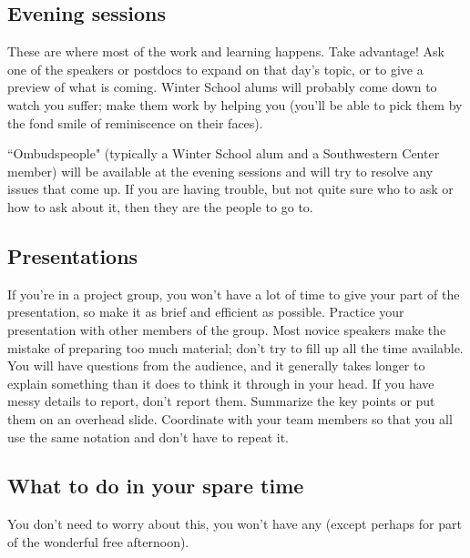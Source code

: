 \documentclass{article}
\begin{document}
\subsection{Evening sessions}
\label{sec:even-quest-sess}
These are where most of the work and learning happens. Take advantage!  
Ask one of the speakers or postdocs to expand on that day's topic, or to
give a preview of what is coming.  Winter School alums will probably come down to
watch you suffer; make them work by helping you (you'll be able to
pick them by the fond smile of reminiscence on their faces).

``Ombudspeople" (typically a Winter School alum and a Southwestern Center member) 
will be available at the evening sessions and will try to resolve any issues that come up.  
If you are having trouble, but not quite sure who to ask or how to ask about it, then they 
are the people to go to.


\subsection{Presentations}
\label{sec:presentations}
If you're in a project group, you won't have a lot of time to give your part of the presentation, 
so make it as brief and efficient as possible. Practice your presentation with other members
of the group. Most novice speakers make the mistake of preparing too
much material; don't try to fill up all the time available. You will
have questions from the audience, and it generally takes longer to
explain something than it does to think it through in your head. If
you have messy details to report, don't report them. Summarize the
key points or put them on an overhead slide. Coordinate with your
team members so that you all use the same notation and don't have to
repeat it. 

\subsection{What to do in your spare time}
\label{sec:what-do-your}
You don't need to worry about this, you won't have any (except perhaps for part of the wonderful
free afternoon).
\end{document}
